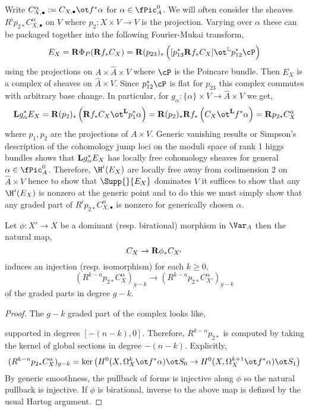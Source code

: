 \documentclass[12pt]{article}
\begin{document}
\begin{rmk}
Write $C^\alpha_{X, \bullet} := C_{X, \bullet} \ot f^* \alpha$ for $\alpha \in \fPic^0_A$. We will often consider the sheaves $R^i p_{2*} C_{X,\bullet}^\alpha$ on $V$ where $p_2 : X \times V \to V$ is the projection. Varying over $\alpha$ these can be packaged together into the following Fourier-Mukai transform,
\[ E_X = \R \Phi_P(\R f_* C_{X}) = \R (p_{23})_* \left( [p_{13}^* \R f_* C_X] \ot^{\LL} p_{12}^* \cP \right) \]
using the projections on $A \times \hat{A} \times V$ where $\cP$ is the Poincare bundle. Then $E_X$ is a complex of sheaves on $\hat{A} \times V$. Since $p_{12}^* \cP$ is flat for $p_{23}$ this complex commutes with arbitrary base change. In particular, for $g_{\alpha} : \{ \alpha \} \times V \to \hat{A} \times V$ we get,
\[ \Lbf g_{\alpha}^* E_X = \R (p_{2})_* \left( \R f_* C_X \ot^{\Lbf} p_1^* \alpha \right) = \R (p_{2})_* \R f_* \left( C_X \ot^{\Lbf} f^* \alpha \right) = \R p_{2*} C_X^\alpha \] 
where $p_1, p_2$ are the projections of $A \times V$. Generic vanishing results or Simpson's description of the cohomology jump loci on the moduli space of rank 1 higgs bundles shows that $\mathbf{L} g_\alpha^* E_X$ has locally free cohomology sheaves for general $\alpha \in \fPic^0_A$. Therefore, $\H^i(E_X)$ are locally free away from codimension $2$ on $\hat{A} \times V$ hence to show that $\Supp{}{E_X}$ dominates $V$ it suffices to show that any $\H^i(E_X)$ is nonzero at the generic point and to do this we must simply show that any graded part of $R^i p_{2*} C^\alpha_{X, \bullet}$ is nonzero for generically chosen $\alpha$.
\end{rmk}


\begin{prop} \label{prop:dominant_morphism}
Let $\phi :  X' \to X$ be a dominant (resp. birational) morphism in $\Var_A$ then the natural map,
\[ C_{X} \to \mathbf{R} \phi_* C_{X'} \]
induces an injection (resp. isomorphism) for each $k \ge 0$,
\[ (R^{k-n} p_{2 *} C_{X}^\alpha)_{g-k} \to (R^{k-n} p_{2 *} C_{X'}^\alpha)_{g-k} \]
of the graded parts in degree $g-k$. 
\end{prop}

\begin{proof}
The $g-k$ graded part of the complex looks like,
\begin{center}
\end{center}
supported in degrees $[-(n-k), 0]$. Therefore, $R^{k-n} p_{2*}$ is computed by taking the kernel of global sections in degree $-(n-k)$. Explicitly, 
\[ (R^{k-n} p_{2*} C_X^\alpha)_{g-k} = \ker{\left( H^0(X, \Omega^k_X \ot f^* \alpha) \ot S_0 \to H^0(X, \Omega^{k+1}_X \ot f^* \alpha) \ot S_1 \right)} \]
By generic smoothness, the pullback of forms is injective along $\phi$ so the natural pullback is injective. If $\phi$ is birational, inverse to the above map is defined by the usual Hartog argument.
\end{proof}
\end{document}
